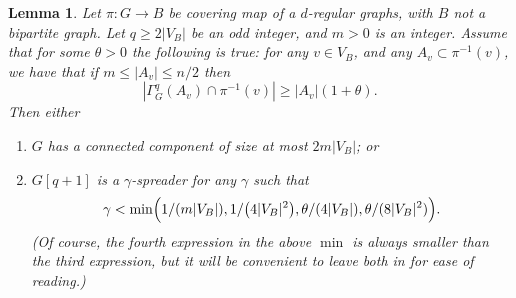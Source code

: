 \documentclass{memo-l}
\theoremstyle{plain}
\newtheorem{lemma}[theorem]{Lemma}
\theoremstyle{definition}
\numberwithin{section}{chapter}
\numberwithin{equation}{chapter}
\newcommand{\from}{\colon}
\theoremstyle{plain}
\theoremstyle{definition}
\begin{document}
\begin{lemma}\label{le:nonbipartite_spreading}
Let $\pi\from G\to B$ be covering map of a $d$-regular graphs, with
$B$ not a bipartite graph.
Let $q\ge 2|V_B|$ be an odd
integer, and $m>0$ is an integer.  
Assume that for some $\theta>0$ the following is true:
for any $v\in V_B$, and any
$A_v\subset \pi^{-1}(v)$, we have that if $m\le |A_v|\le n/2$ then
\begin{equation}\label{eq:spreading_in_fibre}
|\Gamma^q_G(A_v)\cap \pi^{-1}(v) | \ge |A_v|(1+ \theta).
\end{equation}
Then either
\begin{enumerate}
\item $G$ has a connected component of size at most $2m|V_B|$; or
\item $G[q+1]$ is a $\gamma$-spreader for any $\gamma$ such that
\begin{equation}\label{eq:gamma_inequalities}
\gamma < \min\Bigl( 1/(m|V_B|), 1/\bigl(4|V_B|^2\bigr)  ,
\theta/(4|V_B|),\theta/(8|V_B|^2)  \Bigr) .
\end{equation}
(Of course, the fourth expression in the above $\min$ is always smaller
than the third expression, but it will be convenient to leave both
in for ease of reading.)
\end{enumerate}
\end{lemma}
\end{document}
